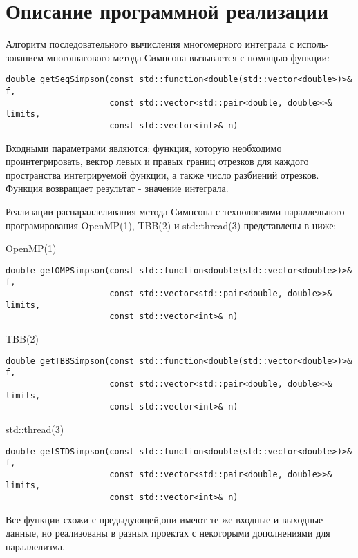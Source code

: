 \documentclass{report}
\begin{document}
\section*{Описание программной реализации}
\par Алгоритм последовательного вычисления многомерного интеграла с исполь-
зованием многошагового метода Симпсона вызывается с помощью функции:
\begin{lstlisting}
double getSeqSimpson(const std::function<double(std::vector<double>)>& f,
                     const std::vector<std::pair<double, double>>& limits,
                     const std::vector<int>& n) 

\end{lstlisting}
\par Входными параметрами являются: функция, которую необходимо проинтегрировать, вектор левых и правых границ отрезков для каждого пространства интегрируемой функции, а также число разбиений отрезков. Функция возвращает результат - значение интеграла.
\par Реализации распараллеливания метода Симпсона с технологиями параллельного програмирования OpenMP(1), TBB(2) и std::thread(3) представлены в ниже:
\par OpenMP(1)
\begin{lstlisting}
double getOMPSimpson(const std::function<double(std::vector<double>)>& f,
                     const std::vector<std::pair<double, double>>& limits,
                     const std::vector<int>& n) 
\end{lstlisting}
\par TBB(2)
\begin{lstlisting}
double getTBBSimpson(const std::function<double(std::vector<double>)>& f,
                     const std::vector<std::pair<double, double>>& limits,
                     const std::vector<int>& n)
\end{lstlisting}
\par std::thread(3)
\begin{lstlisting}
double getSTDSimpson(const std::function<double(std::vector<double>)>& f,
                     const std::vector<std::pair<double, double>>& limits,
                     const std::vector<int>& n)
\end{lstlisting}
                     
\par Все функции схожи с предыдующей,они имеют те же входные и выходные данные, но реализованы в разных проектах с некоторыми дополнениями для параллелизма.
\newpage
\end{document}
